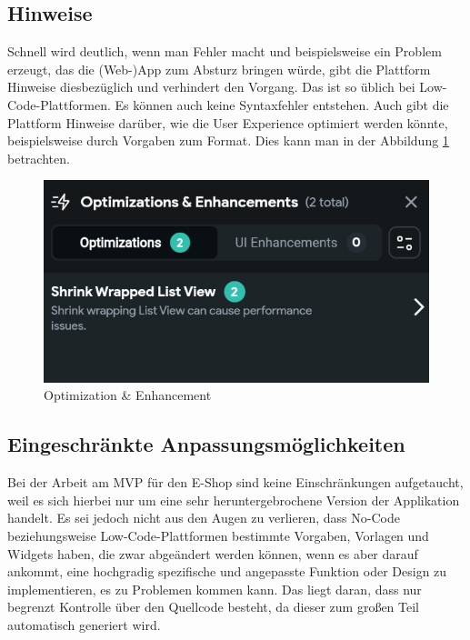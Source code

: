\documentclass[acmtog, language=ngerman]{acmart}
\begin{document}
\subsection{Hinweise}
Schnell wird deutlich, wenn man Fehler macht und beispielsweise ein Problem erzeugt, das die (Web-)App zum Absturz bringen würde, gibt die Plattform Hinweise diesbezüglich und verhindert den Vorgang. Das ist so üblich bei Low-Code-Plattformen. Es können auch keine Syntaxfehler entstehen.
Auch gibt die Plattform Hinweise darüber, wie die User Experience optimiert werden könnte, beispielsweise durch Vorgaben zum Format. Dies kann man in der Abbildung \ref{fig:optimization_ff} betrachten.
\begin{figure}[h]
    \centering
    \includegraphics[width=1\linewidth]{images/FF_optimization.png}
    \caption{Optimization \& Enhancement}
    \label{fig:optimization_ff}
\end{figure}

\subsection{Eingeschränkte Anpassungsmöglichkeiten}
Bei der Arbeit am MVP für den E-Shop sind keine Einschränkungen aufgetaucht, weil es sich hierbei nur um eine sehr heruntergebrochene Version der Applikation handelt. Es sei jedoch nicht aus den Augen zu verlieren, dass No-Code beziehungsweise Low-Code-Plattformen bestimmte Vorgaben, Vorlagen und Widgets haben, die zwar abgeändert werden können, wenn es aber darauf ankommt, eine hochgradig spezifische und angepasste Funktion oder Design zu implementieren, es zu Problemen kommen kann. Das liegt daran, dass nur begrenzt Kontrolle über den Quellcode besteht, da dieser zum großen Teil automatisch generiert wird.
\end{document}
